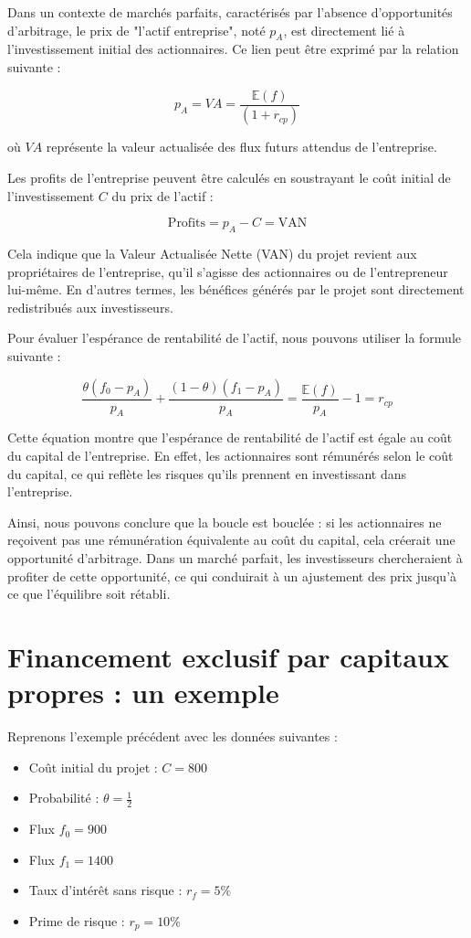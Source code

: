 \documentclass[a4paper, 12pt]{report}
\begin{document}
Dans un contexte de marchés parfaits, caractérisés par l'absence d'opportunités d'arbitrage, le prix de "l'actif entreprise", noté \( p_A \), est directement lié à l'investissement initial des actionnaires. Ce lien peut être exprimé par la relation suivante :

\[
p_A = VA = \frac{\mathbb{E}(f)}{(1 + r_{cp})}
\]

où \( VA \) représente la valeur actualisée des flux futurs attendus de l'entreprise.

Les profits de l'entreprise peuvent être calculés en soustrayant le coût initial de l'investissement \( C \) du prix de l'actif :

\[
\text{Profits} = p_A - C = \text{VAN}
\]

Cela indique que la Valeur Actualisée Nette (VAN) du projet revient aux propriétaires de l'entreprise, qu'il s'agisse des actionnaires ou de l'entrepreneur lui-même. En d'autres termes, les bénéfices générés par le projet sont directement redistribués aux investisseurs.

Pour évaluer l'espérance de rentabilité de l'actif, nous pouvons utiliser la formule suivante :

\[
\frac{\theta (f_0 - p_A)}{p_A} + \frac{(1 - \theta)(f_1 - p_A)}{p_A} = \frac{\mathbb{E}(f)}{p_A} - 1 = r_{cp}
\]

Cette équation montre que l'espérance de rentabilité de l'actif est égale au coût du capital de l'entreprise. En effet, les actionnaires sont rémunérés selon le coût du capital, ce qui reflète les risques qu'ils prennent en investissant dans l'entreprise.

Ainsi, nous pouvons conclure que la boucle est bouclée : si les actionnaires ne reçoivent pas une rémunération équivalente au coût du capital, cela créerait une opportunité d'arbitrage. Dans un marché parfait, les investisseurs chercheraient à profiter de cette opportunité, ce qui conduirait à un ajustement des prix jusqu'à ce que l'équilibre soit rétabli.

\section{Financement exclusif par capitaux propres : un exemple}

Reprenons l'exemple précédent avec les données suivantes :

\begin{itemize}
	\item Coût initial du projet : \( C = 800 \)
	\item Probabilité : \( \theta = \frac{1}{2} \)
	\item Flux \( f_0 = 900 \)
	\item Flux \( f_1 = 1400 \)
	\item Taux d'intérêt sans risque : \( r_f = 5\% \)
	\item Prime de risque : \( r_p = 10\% \)
\end{itemize}
\end{document}
